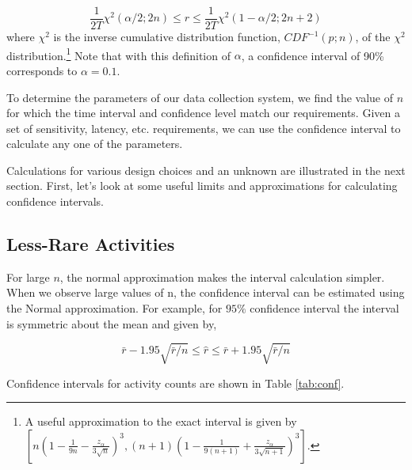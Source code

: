 \documentclass{article}
\begin{document}
\begin{equation}
    \label{eq:chisqconf}
    \frac{1}{2T} \chi^2(\alpha/2;2n) \leq r \leq \frac{1}{2T} \chi^2(1-\alpha/2;2n+2)
\end{equation}
where $\chi^2$ is the inverse cumulative distribution function, $CDF^{-1}(p; n)$, of the $\chi^2$ distribution.\footnote{A useful approximation to the exact interval is given by  $[ n(1 - \frac{1}{9n} - \frac{z_{\alpha}}{3\sqrt{n}})^3 , (n+1)(1- \frac{1}{9(n+1)} + \frac{z_{\alpha}}{3\sqrt{n+1}})^3]$. }
Note that with this definition of $\alpha$, a confidence interval of 90\% corresponds to $\alpha=0.1$.


To determine the parameters of our data collection system, we find the value of $n$ for which the time interval and confidence level match our requirements.  Given a set of sensitivity, latency, etc. requirements, we can use the confidence interval to calculate any one of the parameters. 

Calculations for various design choices and an unknown are illustrated in the next section.  First, let's look at some useful limits and approximations for calculating confidence intervals.

\subsection{Less-Rare Activities} 

For large $n$, the normal approximation makes the interval calculation simpler. When we observe large values of n, the confidence interval can be estimated using the Normal approximation. For example, for $95\%$ confidence interval the interval is symmetric about the mean and given by,

\begin{equation}
    \label{eq:largenconf}
    \bar{r} - 1.95 \sqrt{\bar{r}/n} \leq \hat{r} \leq \bar{r} + 1.95 \sqrt{\bar{r}/n}
\end{equation}

Confidence intervals for activity counts are shown in Table \ref{tab:conf}.
\end{document}
